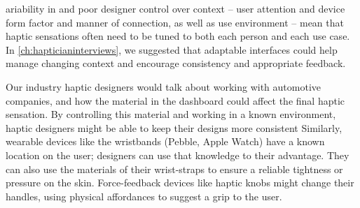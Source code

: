 %

ariability in and poor designer control over context --  user attention and  device form factor and manner of connection, as well as use environment -- mean that haptic sensations often need to be tuned to both each person and each use case.
In \autoref{ch:hapticianinterviews}, we suggested that adaptable interfaces could help manage changing context and encourage consistency and appropriate feedback.

Our industry haptic designers would talk about working with automotive companies, and how the material in the dashboard could affect the final haptic sensation.
By controlling this material and working in a known environment, haptic designers might be able to keep their designs more consistent
Similarly, wearable devices like the wristbands (Pebble, Apple Watch) have a known location on the user; designers can use that knowledge to their advantage. They can also use the materials of their wrist-straps to ensure a reliable tightness or pressure on the skin.
Force-feedback devices like haptic knobs might change their handles, using physical affordances to suggest a grip to the user.


